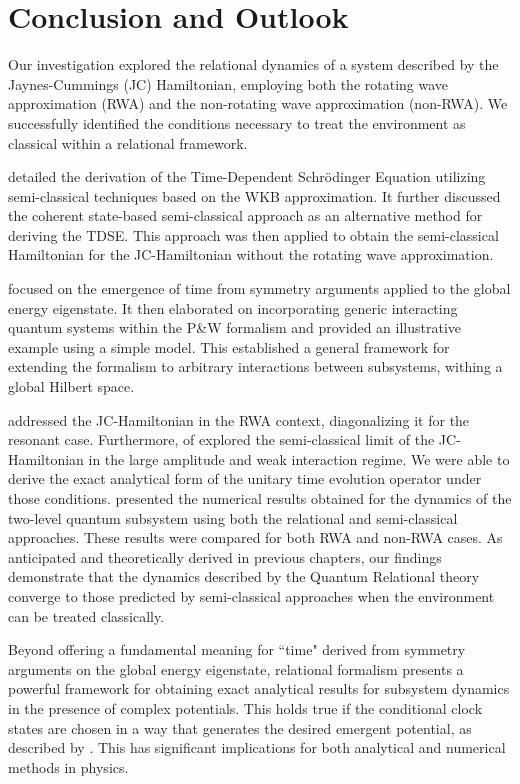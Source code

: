 \chapter{Conclusion and Outlook\label{chap:conclusion}}

Our investigation explored the relational dynamics of a system described by the Jaynes-Cummings (JC) Hamiltonian, employing both the rotating wave approximation (RWA) and the non-rotating wave approximation (non-RWA). We successfully identified the conditions necessary to treat the environment as classical within a relational framework.

 detailed the derivation of the Time-Dependent Schrödinger Equation utilizing semi-classical techniques based on the WKB approximation. It further discussed the coherent state-based semi-classical approach as an alternative method for deriving the TDSE. This approach was then applied to obtain the semi-classical Hamiltonian for the JC-Hamiltonian without the rotating wave approximation.

 focused on the emergence of time from symmetry arguments applied to the global energy eigenstate. It then elaborated on incorporating generic interacting quantum systems within the P\&W formalism and provided an illustrative example using a simple model. This established a general framework for extending the formalism to arbitrary interactions between subsystems, withing a global Hilbert space.

 addressed the JC-Hamiltonian in the RWA context, diagonalizing it for the resonant case. Furthermore,  of  explored the semi-classical limit of the JC-Hamiltonian in the large amplitude and weak interaction regime. We were able to derive the exact analytical form of the unitary time evolution operator under those conditions.  presented the numerical results obtained for the dynamics of the two-level quantum subsystem using both the relational and semi-classical approaches. These results were compared for both RWA and non-RWA cases. As anticipated and theoretically derived in previous chapters, our findings demonstrate that the dynamics described by the Quantum Relational theory converge to those predicted by semi-classical approaches when the environment can be treated classically.

Beyond offering a fundamental meaning for ``time" derived from symmetry arguments on the global energy eigenstate, relational formalism presents a powerful framework for obtaining exact analytical results for subsystem dynamics in the presence of complex potentials. This holds true if the conditional clock states are chosen in a way that generates the desired emergent potential, as described by . This has significant implications for both analytical and numerical methods in physics.

